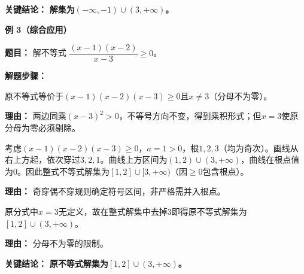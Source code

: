 \begin{examplebox}
	\textbf{\textcolor{CExample}{关键结论：}}
	\textbf{解集为$(-\infty,-1)\cup(3,+\infty)$。}

	\medskip
	\textbf{\textcolor{CExample}{例 3（综合应用）}}

	\textbf{\textcolor{CExample}{题目：}}
	解不等式 $\dfrac{(x-1)(x-2)}{x-3}\geq 0$。

	\textbf{\textcolor{CExample}{解题步骤：}}
	\begin{description}[style=nextline, leftmargin=2.8em, labelsep=0.5em, itemsep=0.45em]
		\item[\textbf{第一步（转化为整式不等式）：}] 原不等式等价于$(x-1)(x-2)(x-3)\geq 0$且$x\neq 3$（分母不为零）。
			\par\textbf{理由：} 两边同乘$(x-3)^2>0$，不等号方向不变，得到乘积形式；但$x=3$使原分母为零必须剔除。

		\item[\textbf{第二步（穿根法求解整式不等式）：}] 考虑$(x-1)(x-2)(x-3)\geq 0$，$a=1>0$，根$1,2,3$（均为奇次）。画线从右上方起，依次穿过$3,2,1$。曲线上方区间为$(1,2)\cup(3,+\infty)$，曲线在根点值为$0$。因此整式不等式解集为$[1,2]\cup[3,+\infty)$（因$\geq0$包含根点）。
			\par\textbf{理由：} 奇穿偶不穿规则确定符号区间，非严格需并入根点。

		\item[\textbf{第三步（剔除分母根）：}] 原分式中$x=3$无定义，故在整式解集中去掉$3$即得原不等式解集为$[1,2]\cup(3,+\infty)$。
			\par\textbf{理由：} 分母不为零的限制。
	\end{description}

	\textbf{\textcolor{CExample}{关键结论：}}
	\textbf{原不等式解集为$[1,2]\cup(3,+\infty)$。}
\end{examplebox}
